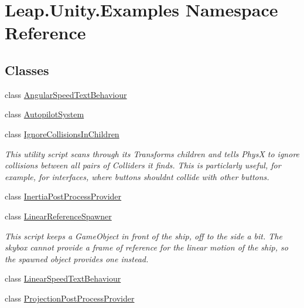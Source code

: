 \hypertarget{namespace_leap_1_1_unity_1_1_examples}{}\section{Leap.\+Unity.\+Examples Namespace Reference}
\label{namespace_leap_1_1_unity_1_1_examples}
\subsection*{Classes}
\begin{DoxyCompactItemize}
\item 
class \mbox{\hyperlink{class_leap_1_1_unity_1_1_examples_1_1_angular_speed_text_behaviour}{Angular\+Speed\+Text\+Behaviour}}
\item 
class \mbox{\hyperlink{class_leap_1_1_unity_1_1_examples_1_1_autopilot_system}{Autopilot\+System}}
\item 
class \mbox{\hyperlink{class_leap_1_1_unity_1_1_examples_1_1_ignore_collisions_in_children}{Ignore\+Collisions\+In\+Children}}
\begin{DoxyCompactList}\small\item\em This utility script scans through its Transform\textquotesingle{}s children and tells PhysX to ignore collisions between all pairs of Colliders it finds. This is particlarly useful, for example, for interfaces, where buttons shouldn\textquotesingle{}t collide with other buttons. \end{DoxyCompactList}\item 
class \mbox{\hyperlink{class_leap_1_1_unity_1_1_examples_1_1_inertia_post_process_provider}{Inertia\+Post\+Process\+Provider}}
\item 
class \mbox{\hyperlink{class_leap_1_1_unity_1_1_examples_1_1_linear_reference_spawner}{Linear\+Reference\+Spawner}}
\begin{DoxyCompactList}\small\item\em This script keeps a Game\+Object in front of the ship, off to the side a bit. The skybox cannot provide a frame of reference for the linear motion of the ship, so the spawned object provides one instead. \end{DoxyCompactList}\item 
class \mbox{\hyperlink{class_leap_1_1_unity_1_1_examples_1_1_linear_speed_text_behaviour}{Linear\+Speed\+Text\+Behaviour}}
\item 
class \mbox{\hyperlink{class_leap_1_1_unity_1_1_examples_1_1_projection_post_process_provider}{Projection\+Post\+Process\+Provider}}

\end{DoxyCompactItemize}
